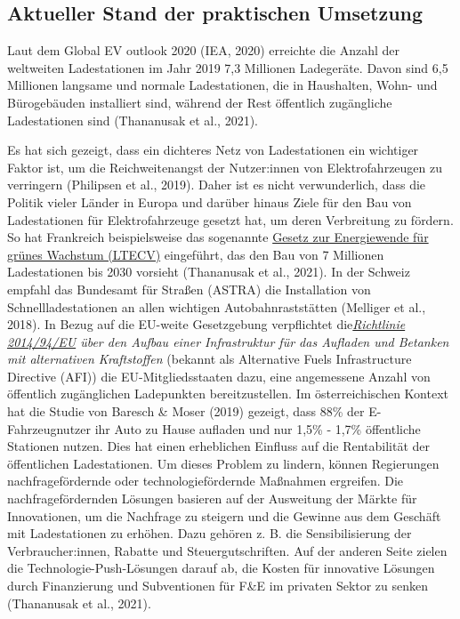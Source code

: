 \documentclass[
]{book}
\begin{document}
\hypertarget{aktueller-stand-der-praktischen-umsetzung-8}{%
\subsection*{Aktueller Stand der praktischen Umsetzung}\label{aktueller-stand-der-praktischen-umsetzung-8}}

Laut dem Global EV outlook 2020 (IEA, 2020) erreichte die Anzahl der weltweiten Ladestationen im Jahr 2019 7,3 Millionen Ladegeräte. Davon sind 6,5 Millionen langsame und normale Ladestationen, die in Haushalten, Wohn- und Bürogebäuden installiert sind, während der Rest öffentlich zugängliche Ladestationen sind (Thananusak et al., 2021).

Es hat sich gezeigt, dass ein dichteres Netz von Ladestationen ein wichtiger Faktor ist, um die Reichweitenangst der Nutzer:innen von Elektrofahrzeugen zu verringern (Philipsen et al., 2019). Daher ist es nicht verwunderlich, dass die Politik vieler Länder in Europa und darüber hinaus Ziele für den Bau von Ladestationen für Elektrofahrzeuge gesetzt hat, um deren Verbreitung zu fördern. So hat Frankreich beispielsweise das sogenannte \href{https://www.iea.org/policies/8737-law-on-energy-transition-for-green-growth-ltecv}{Gesetz zur Energiewende für grünes Wachstum (LTECV)} eingeführt, das den Bau von 7 Millionen Ladestationen bis 2030 vorsieht (Thananusak et al., 2021). In der Schweiz empfahl das Bundesamt für Straßen (ASTRA) die Installation von Schnellladestationen an allen wichtigen Autobahnraststätten (Melliger et al., 2018). In Bezug auf die EU-weite Gesetzgebung verpflichtet die\emph{\href{https://eur-lex.europa.eu/legal-content/EN/TXT/HTML/?uri=CELEX:32014L0094\&from=en}{Richtlinie 2014/94/EU} über den Aufbau einer Infrastruktur für das Aufladen und Betanken mit alternativen Kraftstoffen} (bekannt als Alternative Fuels Infrastructure Directive (AFI)) die EU-Mitgliedsstaaten dazu, eine angemessene Anzahl von öffentlich zugänglichen Ladepunkten bereitzustellen.
Im österreichischen Kontext hat die Studie von Baresch \& Moser (2019) gezeigt, dass 88\% der E-Fahrzeugnutzer ihr Auto zu Hause aufladen und nur 1,5\% - 1,7\% öffentliche Stationen nutzen. Dies hat einen erheblichen Einfluss auf die Rentabilität der öffentlichen Ladestationen. Um dieses Problem zu lindern, können Regierungen nachfragefördernde oder technologiefördernde Maßnahmen ergreifen. Die nachfragefördernden Lösungen basieren auf der Ausweitung der Märkte für Innovationen, um die Nachfrage zu steigern und die Gewinne aus dem Geschäft mit Ladestationen zu erhöhen. Dazu gehören z. B. die Sensibilisierung der Verbraucher:innen, Rabatte und Steuergutschriften. Auf der anderen Seite zielen die Technologie-Push-Lösungen darauf ab, die Kosten für innovative Lösungen durch Finanzierung und Subventionen für F\&E im privaten Sektor zu senken (Thananusak et al., 2021).
\end{document}
